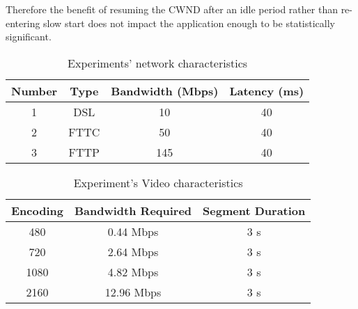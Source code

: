 \documentclass[10pt,sigconf]{acmart}
\begin{document}
Therefore the benefit of resuming the CWND after an idle period rather than re-entering slow start does not impact the application enough to be statistically significant.






\begin{table}[]
    \centering
    \begin{tabular}{c|c|c|c}
    \toprule
        Number & Type & Bandwidth (Mbps)  & Latency (ms)  \\
    \midrule
         1 & DSL  & 10  & 40 \\
    \midrule
         2 & FTTC & 50  & 40 \\
    \midrule
         3 & FTTP & 145 & 40 \\
    \bottomrule
    \end{tabular}
    \caption{Experiments' network characteristics}
    \label{tab:experiments-network}
\end{table}

\begin{table}[]
    \centering
    \begin{tabular}{c|c|c}
    \toprule
         Encoding & Bandwidth Required & Segment Duration \\
     \midrule
        480  & 0.44  Mbps & 3 s \\
        720  & 2.64  Mbps & 3 s \\
        1080 & 4.82  Mbps & 3 s \\
        2160 & 12.96 Mbps & 3 s \\

    \bottomrule
    \end{tabular}
    \caption{Experiment's Video characteristics}
    \label{tab:experiments-video}
\end{table}
\end{document}
